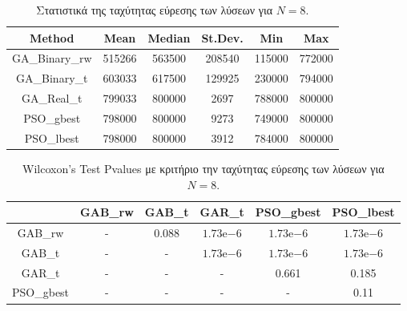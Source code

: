 \documentclass[12pt, a4paper]{article}
\newcommand{\en}{\selectlanguage{english}}
\newcommand{\gr}{\selectlanguage{greek}}
\begin{document}
\begin{table}[H]
	\centering
	\begin{tabular}{| c | c | c | c | c | c |}
		
		\hline
		\en Method & \en Mean & \en Median & \en St.Dev. & \en Min & \en Max \\
		
		\hline
		\en GA\_Binary\_rw & 515266 & 563500 & 208540 & 115000 & 772000 \\ 
		
		\hline
		\en GA\_Binary\_t & 603033 & 617500 & 129925 & 230000 & 794000 \\ 
		
		\hline
		\en GA\_Real\_t & 799033 & 800000 & 2697 & 788000 & 800000 \\ 
		
		\hline
		\en PSO\_gbest & 798000 & 800000 & 9273 & 749000 & 800000\\ 
		
		\hline
		\en PSO\_lbest & 798000 & 800000 & 3912 & 784000 & 800000 \\ 
		
		\hline
		
	\end{tabular}
	\caption{Στατιστικά της ταχύτητας εύρεσης των λύσεων για $N = 8$.}
	\label{tab:iter_N8}
\end{table}


\begin{table}[H]
	\centering
	\begin{tabular}{| c | c | c | c | c | c |}
		
		\hline
		\en  & \en GAB\_rw & \en GAB\_t & \en GAR\_t & \en PSO\_gbest & \en PSO\_lbest\\
		
		\hline
		\en GAB\_rw & - & 0.088 & $1.73\mathrm{e}{-6}$ &  $1.73\mathrm{e}{-6}$ & $1.73\mathrm{e}{-6}$ \\ 
		
		\hline
		\en GAB\_t & - & - & $1.73\mathrm{e}{-6}$ & $1.73\mathrm{e}{-6}$ & $1.73\mathrm{e}{-6}$ \\ 
		
		\hline
		\en GAR\_t & - & - & - & 0.661 & 0.185 \\ 
		
		\hline
		\en PSO\_gbest & - & - & - & - & 0.11 \\ 
		
		\hline
		
	\end{tabular}
	\caption{\en Wilcoxon's Test Pvalues \gr με κριτήριο την ταχύτητας εύρεσης των λύσεων για $N = 8$.}
	\label{tab:iter_pval_N8}
\end{table}
\end{document}
